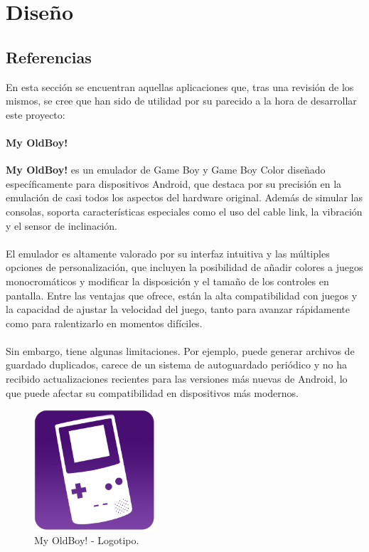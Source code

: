 \chapter{Diseño}
\label{design}

\section{Referencias}
En esta sección se encuentran aquellas aplicaciones que, tras una revisión de los mismos, se cree que han sido de utilidad por su parecido a la hora de desarrollar este proyecto:

\subsubsection{My OldBoy!}

\textbf{My OldBoy!} es un emulador de Game Boy y Game Boy Color diseñado específicamente para dispositivos Android, que destaca por su precisión en la emulación de casi todos los aspectos del hardware original. Además de simular las consolas, soporta características especiales como el uso del cable link, la vibración y el sensor de inclinación.
\\\\
El emulador es altamente valorado por su interfaz intuitiva y las múltiples opciones de personalización, que incluyen la posibilidad de añadir colores a juegos monocromáticos y modificar la disposición y el tamaño de los controles en pantalla. Entre las ventajas que ofrece, están la alta compatibilidad con juegos y la capacidad de ajustar la velocidad del juego, tanto para avanzar rápidamente como para ralentizarlo en momentos difíciles.
\\\\
Sin embargo, tiene algunas limitaciones. Por ejemplo, puede generar archivos de guardado duplicados, carece de un sistema de autoguardado periódico y no ha recibido actualizaciones recientes para las versiones más nuevas de Android, lo que puede afectar su compatibilidad en dispositivos más modernos.

\begin{figure}[h]
    \centering
    \includegraphics[width=0.4\textwidth]{include/images/myoldboy.png}
    \caption{My OldBoy! - Logotipo.}
    \label{figure:oldboylogo}
\end{figure}

